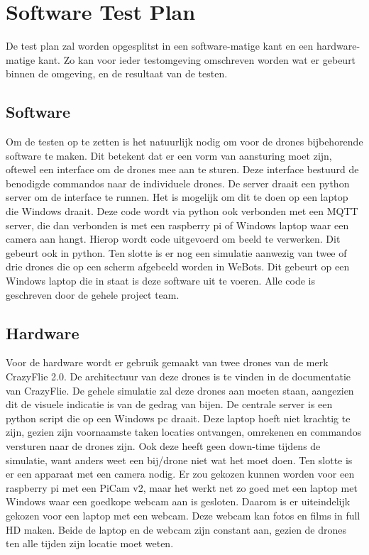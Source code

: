 \section{Software Test Plan}
De test plan zal worden opgesplitst in een software-matige kant en een hardware-matige kant. Zo kan voor ieder testomgeving omschreven worden wat er gebeurt binnen de omgeving, en de resultaat van de testen.

\subsection{Software}
Om de testen op te zetten is het natuurlijk nodig om voor de drones bijbehorende software te maken. Dit betekent dat er een vorm van aansturing moet zijn, oftewel een interface om de drones mee aan te sturen. Deze interface bestuurd de benodigde commandos naar de individuele drones. De server draait een python server om de interface te runnen. Het is mogelijk om dit te doen op een laptop die Windows draait.
Deze code wordt via python ook verbonden met een MQTT server, die dan verbonden is met een raspberry pi of Windows laptop waar een camera aan hangt. Hierop wordt code uitgevoerd om beeld te verwerken. Dit gebeurt ook in python.
Ten slotte is er nog een simulatie aanwezig van twee of drie drones die op een scherm afgebeeld worden in WeBots. Dit gebeurt op een Windows laptop die in staat is deze software uit te voeren.
Alle code is geschreven door de gehele project team.

\subsection{Hardware}
Voor de hardware wordt er gebruik gemaakt van twee drones van de merk CrazyFlie 2.0. De architectuur van deze drones is te vinden in de documentatie van CrazyFlie. De gehele simulatie zal deze drones aan moeten staan, aangezien dit de visuele indicatie is van de gedrag van bijen.
De centrale server is een python script die op een Windows pc draait. Deze laptop hoeft niet krachtig te zijn, gezien zijn voornaamste taken locaties ontvangen, omrekenen en commandos versturen naar de drones zijn. Ook deze heeft geen down-time tijdens de simulatie, want anders weet een bij/drone niet wat het moet doen.
Ten slotte is er een apparaat met een camera nodig. Er zou gekozen kunnen worden voor een raspberry pi met een PiCam v2, maar het werkt net zo goed met een laptop met Windows waar een goedkope webcam aan is gesloten. Daarom is er uiteindelijk gekozen voor een laptop met een webcam. Deze webcam kan fotos en films in full HD maken. Beide de laptop en de webcam zijn constant aan, gezien de drones ten alle tijden zijn locatie moet weten.
